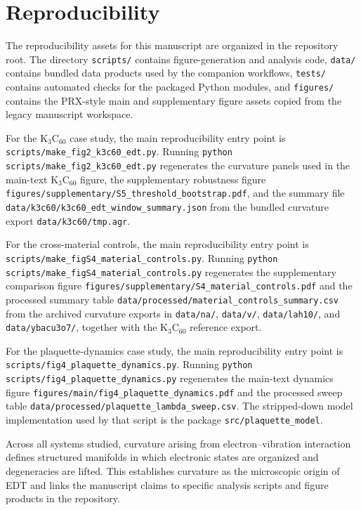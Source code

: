 ﻿\documentclass[aps,prx,reprint,superscriptaddress,longbibliography,floatfix]{revtex4-2}
\begin{document}
\section{Reproducibility}

The reproducibility assets for this manuscript are organized in the repository root. The directory \texttt{scripts/} contains figure-generation and analysis code, \texttt{data/} contains bundled data products used by the companion workflows, \texttt{tests/} contains automated checks for the packaged Python modules, and \texttt{figures/} contains the PRX-style main and supplementary figure assets copied from the legacy manuscript workspace.

For the K$_3$C$_{60}$ case study, the main reproducibility entry point is \texttt{scripts/make\_fig2\_k3c60\_edt.py}. Running \texttt{python scripts/make\_fig2\_k3c60\_edt.py} regenerates the curvature panels used in the main-text K$_3$C$_{60}$ figure, the supplementary robustness figure \texttt{figures/supplementary/S5\_threshold\_bootstrap.pdf}, and the summary file \texttt{data/k3c60/k3c60\_edt\_window\_summary.json} from the bundled curvature export \texttt{data/k3c60/tmp.agr}.

For the cross-material controls, the main reproducibility entry point is \texttt{scripts/make\_figS4\_material\_controls.py}. Running \texttt{python scripts/make\_figS4\_material\_controls.py} regenerates the supplementary comparison figure \texttt{figures/supplementary/S4\_material\_controls.pdf} and the processed summary table \texttt{data/processed/material\_controls\_summary.csv} from the archived curvature exports in \texttt{data/na/}, \texttt{data/v/}, \texttt{data/lah10/}, and \texttt{data/ybacu3o7/}, together with the K$_3$C$_{60}$ reference export.

For the plaquette-dynamics case study, the main reproducibility entry point is \texttt{scripts/fig4\_plaquette\_dynamics.py}. Running \texttt{python scripts/fig4\_plaquette\_dynamics.py} regenerates the main-text dynamics figure \texttt{figures/main/fig4\_plaquette\_dynamics.pdf} and the processed sweep table \texttt{data/processed/plaquette\_lambda\_sweep.csv}. The stripped-down model implementation used by that script is the package \texttt{src/plaquette\_model}.

Across all systems studied, curvature arising from electron--vibration interaction defines structured manifolds in which electronic states are organized and degeneracies are lifted. This establishes curvature as the microscopic origin of EDT and links the manuscript claims to specific analysis scripts and figure products in the repository.



\end{document}

